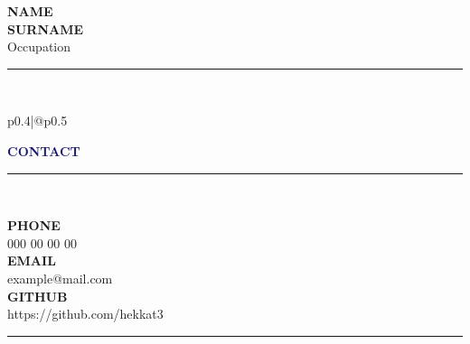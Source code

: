 \documentclass[9pt,a4paper]{article}
\newcommand{\myname}[1]{\textbf{\Huge\selectfont\MakeUppercase{#1}}\\}
\newcommand{\myjobtitle}[1]{{\large #1}\\}
\newcommand{\myline}[1]{\rule{#1}{1.0pt}\\}
\newcommand{\topic}[1]{\textcolor{MidnightBlue}{\textbf{\Large\selectfont\MakeUppercase{#1}}\\\vspace{-0.5cm}\myline{1.0cm}}}
\newcommand{\uppersubtopicnnl}[1]{\textcolor{MidnightBlue!50}{\textbf{\normalsize\selectfont\MakeUppercase{#1}}}} %
\newcommand{\uppersubtopic}[1]{\uppersubtopicnnl{#1}\\}
\begin{document}
\begin{flushleft}
  \myname{NAME} %
  \myname{SURNAME} %
  \myjobtitle{Occupation} %
  \textcolor{CornflowerBlue}{\rule{\linewidth}{1pt}}\\
\end{flushleft}

\vspace{-1.25cm} %
\begin{multicols}{2}
\setlength{\arrayrulewidth}{1pt} %

\noindent\begin{tabular}{p{0.4\textwidth}|@{\hspace{5mm}}p{0.5\textwidth}}

{
\begin{flushleft}
\topic{contact}
\uppersubtopic{phone}
000 00 00 00\\
\uppersubtopic{email}
example@mail.com\\
\uppersubtopic{github}
https://github.com/hekkat3\\

\textcolor{CornflowerBlue}{\rule{\linewidth}{0.5pt}}\\


\end{flushleft}}
\end{tabular}
\end{multicols}
\end{document}
